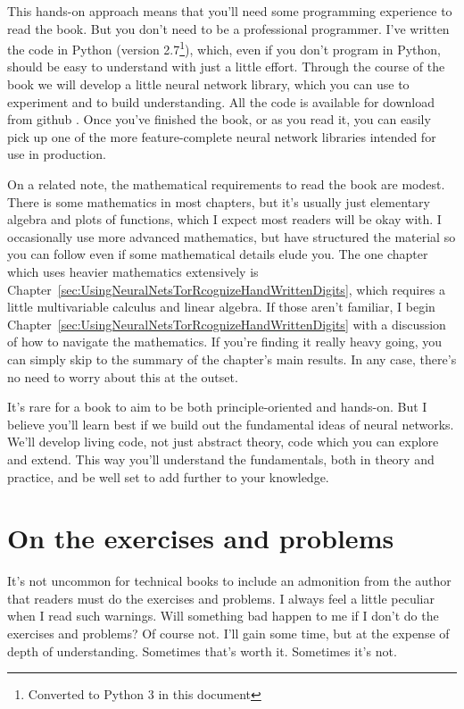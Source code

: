This hands-on approach means that you'll need some programming experience to read the book. But you don't need to be a professional programmer. I've written the code in Python (version 2.7\footnote{Converted to Python 3 in this document}), which, even if you don't program in Python, should be easy to understand with just a little effort. Through the course of the book we will develop a little neural network library, which you can use to experiment and to build understanding. All the code is available for download from github \cite{Nielsengithub2019}. Once you've finished the book, or as you read it, you can easily pick up one of the more feature-complete neural network libraries intended for use in production.

On a related note, the mathematical requirements to read the book are modest. There is some mathematics in most chapters, but it's usually just elementary algebra and plots of functions, which I expect most readers will be okay with. I occasionally use more advanced mathematics, but have structured the material so you can follow even if some mathematical details elude you. The one chapter which uses heavier mathematics extensively is Chapter~\ref{sec:UsingNeuralNetsTorRcognizeHandWrittenDigits}, which requires a little multivariable calculus and linear algebra. If those aren't familiar, I begin Chapter~\ref{sec:UsingNeuralNetsTorRcognizeHandWrittenDigits} with a discussion of how to navigate the mathematics. If you're finding it really heavy going, you can simply skip to the summary of the chapter's main results. In any case, there's no need to worry about this at the outset.

It's rare for a book to aim to be both principle-oriented and hands-on. But I believe you'll learn best if we build out the fundamental ideas of neural networks. We'll develop living code, not just abstract theory, code which you can explore and extend. This way you'll understand the fundamentals, both in theory and practice, and be well set to add further to your knowledge.


\section*{On the exercises and problems}

It's not uncommon for technical books to include an admonition from the author that readers must do the exercises and problems. I always feel a little peculiar when I read such warnings. Will something bad happen to me if I don't do the exercises and problems? Of course not. I'll gain some time, but at the expense of depth of understanding. Sometimes that's worth it. Sometimes it's not.

